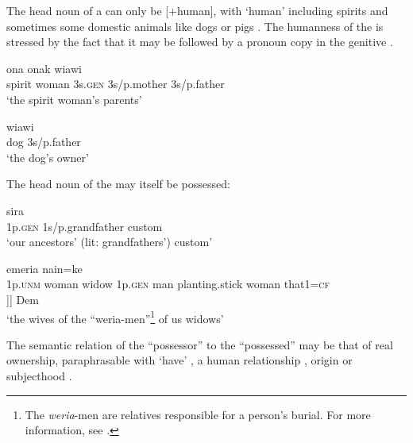 The head noun of a 
 can only be [+human], with `human' including spirits  and sometimes some domestic animals like dogs or pigs . The humanness of the  is stressed by the fact that it may be followed by a pronoun copy in the genitive .

\ea%
\label{ex:4:x402}
\gll {}   ona  onak  wiawi \\
    spirit  woman  3s.\textsc{gen}  3s/p.mother  3s/p.father  \\
\glt`the spirit woman's parents'

\z

\ea%
\label{ex:4:x403}
\gll {}  wiawi \\
  dog  3s/p.father    \\
\glt`the dog's owner'
\z

The head noun of the  may itself be possessed:

\ea%
\label{ex:4:x404}
\gll {}   sira \\
 1p.\textsc{gen}  1s/p.grandfather  custom     \\
\glt`our ancestors' (lit: grandfathers') custom'
\z

\ea%
\label{ex:4:x405}
\glll {}        emeria  nain=ke \\
   1p.\textsc{unm}  woman  widow  1p.\textsc{gen}  man  planting.stick  woman  that1=\textsc{cf}   \\
[Poss NP        [Poss NP            [HN]]]   Dem \\
\glt`the wives of the ``weria-men''\footnote{The \textit{weria}-men are relatives responsible for a person's burial. For more information, see .} of us widows'
\z

The semantic relation of the ``possessor'' to the ``possessed'' may be that of real ownership, paraphrasable with `have' , a human relationship , origin  or subjecthood . 

